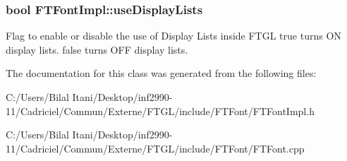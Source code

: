 \subsubsection[{\texorpdfstring{use\+Display\+Lists}{useDisplayLists}}]{\setlength{\rightskip}{0pt plus 5cm}bool F\+T\+Font\+Impl\+::use\+Display\+Lists\hspace{0.3cm}{\ttfamily [protected]}}\hypertarget{class_f_t_font_impl_a5c21ea909477c7180b86625fef6af457}{}\label{class_f_t_font_impl_a5c21ea909477c7180b86625fef6af457}
Flag to enable or disable the use of Display Lists inside F\+T\+GL {\ttfamily true} turns ON display lists. {\ttfamily false} turns O\+FF display lists. 

The documentation for this class was generated from the following files\+:\begin{DoxyCompactItemize}
\item 
C\+:/\+Users/\+Bilal Itani/\+Desktop/inf2990-\/11/\+Cadriciel/\+Commun/\+Externe/\+F\+T\+G\+L/include/\+F\+T\+Font/F\+T\+Font\+Impl.\+h\item 
C\+:/\+Users/\+Bilal Itani/\+Desktop/inf2990-\/11/\+Cadriciel/\+Commun/\+Externe/\+F\+T\+G\+L/include/\+F\+T\+Font/F\+T\+Font.\+cpp\end{DoxyCompactItemize}

